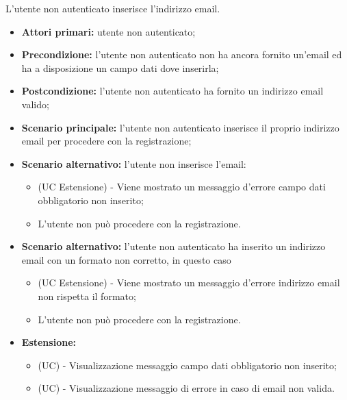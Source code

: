 L'utente non autenticato inserisce l'indirizzo email.
\begin{itemize}
	\item \textbf{Attori primari:} utente non autenticato;
	\item \textbf{Precondizione:} l'utente non autenticato non ha ancora fornito un'email ed ha a disposizione un campo dati dove inserirla;
	\item \textbf{Postcondizione:} l'utente non autenticato ha fornito un indirizzo email valido;
	\item \textbf{Scenario principale:} l'utente non autenticato inserisce il proprio indirizzo email per procedere con la registrazione;
	\item \textbf{Scenario alternativo:} l'utente non inserisce l'email:
	\begin{itemize}
		\item (UC Estensione) - Viene mostrato un messaggio d'errore campo dati obbligatorio non inserito;
		\item L'utente non può procedere con la registrazione.
	\end{itemize}
	\item \textbf{Scenario alternativo:} l'utente non autenticato ha inserito un indirizzo email con un formato non corretto, in questo caso
	\begin{itemize}
		\item (UC Estensione) - Viene mostrato un messaggio d'errore indirizzo email non rispetta il formato;
		\item L'utente non può procedere con la registrazione.
	\end{itemize}
	\item \textbf{Estensione:}
	\begin{itemize}
		\item (UC) - Visualizzazione messaggio campo dati obbligatorio non inserito;
		\item (UC) - Visualizzazione messaggio di errore in caso di email non valida.
	\end{itemize}
\end{itemize}

